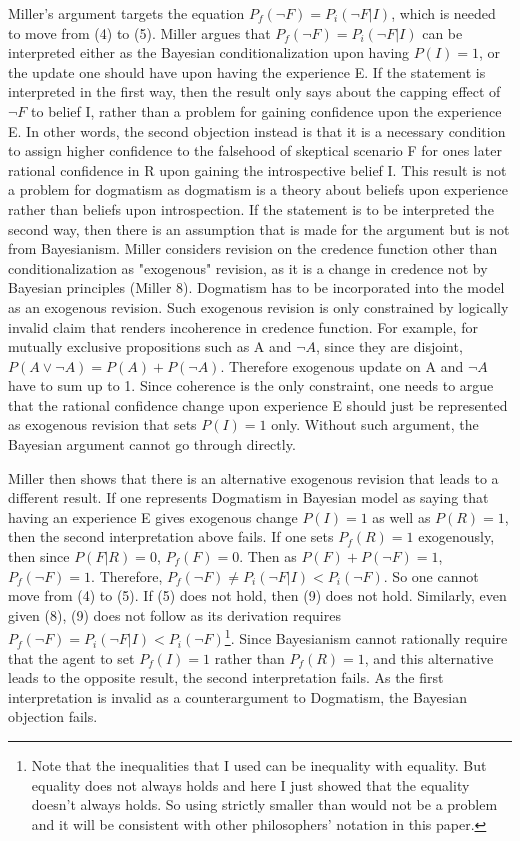 Miller's argument targets the equation
\(P_{f}(\neg F) = P_{i}(\neg F|I)\), which is needed to move from (4) to
(5). Miller argues that \(P_{f}(\neg F) = P_{i}(\neg F|I)\) can be
interpreted either as the Bayesian conditionalization upon having
\(P(I) = 1\), or the update one should have upon having the experience
E. If the statement is interpreted in the first way, then the result
only says about the capping effect of $\neg F$ to belief I,
rather than a problem for gaining confidence upon the experience E. In
other words, the second objection instead is that it is a necessary
condition to assign higher confidence to the falsehood of skeptical
scenario F for ones later rational confidence in R upon gaining the
introspective belief I. This result is not a problem for dogmatism as
dogmatism is a theory about beliefs upon experience rather than beliefs
upon introspection. If the statement is to be interpreted the second
way, then there is an assumption that is made for the argument but is
not from Bayesianism. Miller considers revision on the credence function
other than conditionalization as "exogenous" revision, as it is a change
in credence not by Bayesian principles (Miller 8). Dogmatism has to be
incorporated into the model as an exogenous revision. Such exogenous
revision is only constrained by logically invalid claim that renders
incoherence in credence function. For example, for mutually exclusive
propositions such as A and \(\neg A\), since they are disjoint,
\(P(A \vee \neg A) = P(A) + P(\neg A)\). Therefore exogenous update on A
and \(\neg A\) have to sum up to 1. Since coherence is the only
constraint, one needs to argue that the rational confidence change upon
experience E should just be represented as exogenous revision that sets
\(P(I) = 1\) only. Without such argument, the Bayesian argument cannot
go through directly.

Miller then shows that there is an alternative exogenous revision that
leads to a different result. If one represents Dogmatism in Bayesian model as saying that
having an experience E gives exogenous change \(P(I) = 1\) as well as
\(P(R) = 1\), then the second interpretation above fails. If one sets
\(P_{f}(R) = 1\) exogenously, then since \(P(F|R) = 0\),
\(P_{f}(F) = 0\). Then as \(P(F) + P(\neg F) = 1\),
\(P_{f}(\neg F) = 1\). Therefore,
\(P_{f}(\neg F) \neq P_{i}(\neg F|I) < P_{i}(\neg F)\). So one cannot
move from (4) to (5). If (5) does not hold, then (9) does not hold.
Similarly, even given (8), (9) does not follow as its derivation
requires \(P_{f}(\neg F) = P_{i}(\neg F|I) < P_{i}(\neg F)\)\footnote{Note
  that the inequalities that I used can be inequality with equality. But
  equality does not always holds and here I just showed that the
  equality doesn't always holds. So using strictly smaller than would
  not be a problem and it will be consistent with other philosophers'
  notation in this paper.}. Since Bayesianism cannot rationally require
that the agent to set \(P_{f}(I) = 1\) rather than \(P_{f}(R) = 1\), and
this alternative leads to the opposite result, the second interpretation
fails. As the first interpretation is invalid as a counterargument to
Dogmatism, the Bayesian objection fails.

